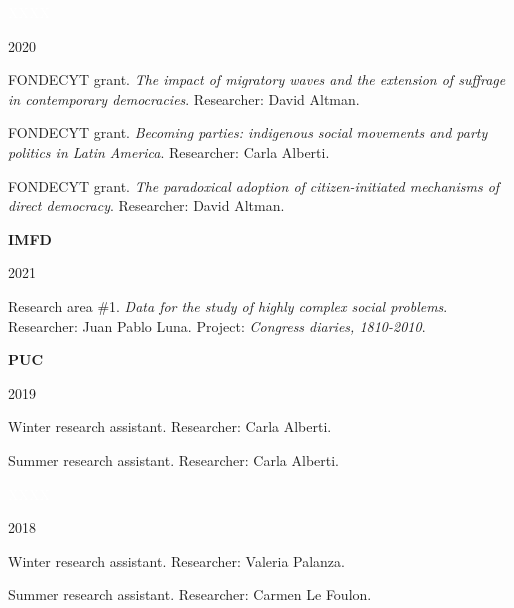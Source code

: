 \documentclass[a4paper, 12pt]{article}
\begin{document}
\begin{multicols}{3}

\textcolor{white}{XXXX}

\columnbreak

2020

\columnbreak

FONDECYT grant. \textit{The impact of migratory waves and the extension of suffrage in contemporary democracies}. Researcher: David Altman.

FONDECYT grant. \textit{Becoming parties: indigenous social movements and party politics in Latin America}. Researcher: Carla Alberti.

FONDECYT grant. \textit{The paradoxical adoption of citizen-initiated mechanisms of direct democracy}. Researcher: David Altman.

\end{multicols}


\begin{multicols}{3}

\textbf{IMFD}

\columnbreak

2021

\columnbreak

Research area \#1. \textit{Data for the study of highly complex social problems}. Researcher: Juan Pablo Luna. Project: \textit{Congress diaries, 1810-2010}.

\end{multicols}


\begin{multicols}{3}

\textbf{PUC}

\columnbreak

2019

\columnbreak

Winter research assistant. Researcher: Carla Alberti.

Summer research assistant. Researcher: Carla Alberti.

\end{multicols}


\begin{multicols}{3}

\textcolor{white}{XXXX}

\columnbreak

2018

\columnbreak

Winter research assistant. Researcher: Valeria Palanza.

Summer research assistant. Researcher: Carmen Le Foulon.

\end{multicols}
\end{document}
